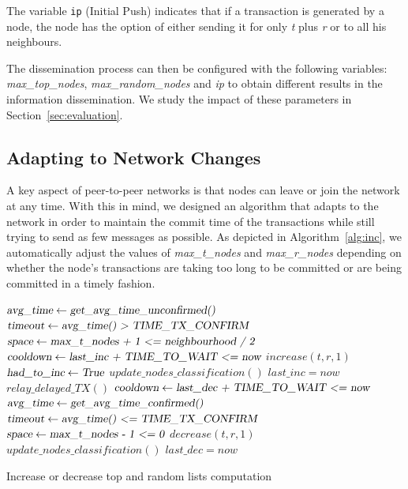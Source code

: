 \documentclass{dads}   %
\begin{document}
The variable \texttt{ip} (Initial Push) indicates that if a transaction is generated by a node, the node has the option of either sending it for only \textit{t} plus \textit{r} or to all his neighbours. 


The dissemination process can then be configured with the following variables: \textsl{max\_top\_nodes}, \textsl{max\_random\_nodes} and \textsl{ip} to obtain different results in the information dissemination. 
We study the impact of these parameters in Section~\ref{sec:evaluation}.



\subsection{Adapting to Network Changes}
\label{sec:nc}
A key aspect of peer-to-peer networks is that nodes can leave or join the network at any  time. With this in mind, we designed an algorithm that adapts to the network in order to maintain the commit time of the transactions while still trying to send as few messages as possible. As  depicted in Algorithm~\ref{alg:inc}, we automatically adjust the values of \textsl{max\_t\_nodes} and \textsl{max\_r\_nodes} depending on whether the node's transactions are taking too long to be committed or are being committed in a  timely fashion.

\begin{algorithm}[t]
\begin{algorithmic}[1]
\State $\textsl{avg\_time} \gets \textsl{get\_avg\_time\_unconfirmed()}$
\State $\textsl{timeout} \gets \textsl{avg\_time() > TIME\_TX\_CONFIRM}$
\State $\textsl{space} \gets \textsl{max\_t\_nodes + 1 <= neighbourhood / 2}$
\State $\textsl{cooldown} \gets \textsl{last\_inc + TIME\_TO\_WAIT <= now}$
  \State $increase(t, r, 1)$
  \State $\textsl{had\_to\_inc} \gets \textsl{True}$
  \State $update\_nodes\_classification()$
  \State $last\_inc = now$
  \State $relay\_delayed\_TX()$
\EndIf
\State $\textsl{cooldown} \gets \textsl{last\_dec + TIME\_TO\_WAIT <= now}$
  \State $\textsl{avg\_time} \gets \textsl{get\_avg\_time\_confirmed()}$
  \State $\textsl{timeout} \gets \textsl{avg\_time() <= TIME\_TX\_CONFIRM}$
  \State $\textsl{space} \gets \textsl{max\_t\_nodes - 1 <= 0}$
    \State $decrease(t, r, 1)$
    \State $update\_nodes\_classification()$
    \State $last\_dec = now$
  \EndIf
\EndIf
\EndFunction
\end{algorithmic}
\caption{Increase or decrease top and random lists computation}
\label{alg:inc}
\end{algorithm}
\end{document}

